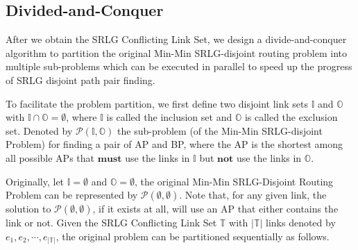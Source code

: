 %



\subsection{Divided-and-Conquer}
\label{subsec:dividedconquer}
After we obtain the SRLG Conflicting Link Set, we design a divide-and-conquer algorithm to partition the original Min-Min SRLG-disjoint routing problem into multiple sub-problems which can be executed in parallel to speed up the progress of SRLG disjoint path pair finding.

To facilitate the problem partition, we first define two disjoint link sets $\mathbb{I}$ and ${\mathbb{O}}$ with $\mathbb{I}\cap {\mathbb{O}}= \emptyset$,  where $\mathbb{I}$ is called the  inclusion set and ${\mathbb{O}}$ is called the exclusion set. Denoted by $\mathcal{P}({\mathbb{I},\mathbb{O}})$ the sub-problem (of the Min-Min SRLG-disjoint Problem) for finding a pair of AP and BP, where the AP is the shortest among all possible APs that $\textbf{must}$ use the links in $\mathbb{I}$ but $\textbf{not}$ use the links in ${\mathbb{O}}$.

Originally, let $\mathbb{I}=\emptyset$ and ${\mathbb{O}}=\emptyset$, the original Min-Min  SRLG-Disjoint Routing Problem can be represented by $\mathcal{P}(\emptyset,\emptyset)$. Note that, for any given link, the solution to $\mathcal{P}(\emptyset,\emptyset)$, if it exists at all, will use an AP that either contains the link or not. Given the SRLG Conflicting Link Set $\mathbb{T}$ with $|\mathbb{T}|$ links denoted by ${e_1},{e_2}, \cdots ,{e_{\left| \mathbb{T} \right|}}$, the original problem can be partitioned sequentially as follows.

